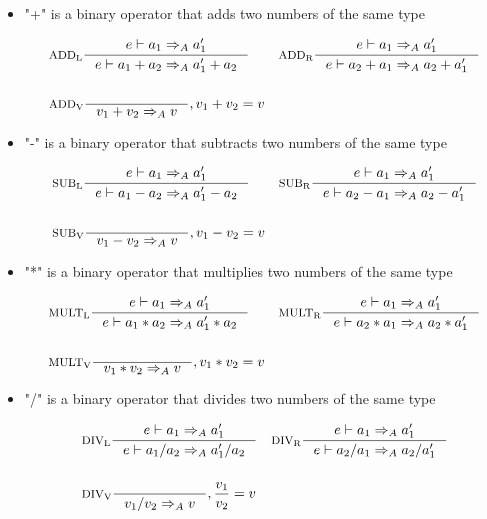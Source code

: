 \begin{itemize}
\item "+" is a binary operator that adds two numbers of the same type

\begin{align*}
&\inference[$\text{ADD}_\text{L}$]{e \vdash a_1 \Rightarrow_A a_1'}
                    {e \vdash  a_1 + a_2 \Rightarrow_A a_1' + a_2}
&
&\inference[$\text{ADD}_\text{R}$]{e \vdash a_1 \Rightarrow_A a_1'}
                    {e \vdash a_2 + a_1 \Rightarrow_A a_2 + a_1'}
\\\\
&\inference[$\text{ADD}_\text{V}$]{}
                    {v_1 + v_2 \Rightarrow_A v}
                    {, v_1 + v_2 = v}
\end{align*}

\item "-" is a binary operator that subtracts two numbers of the same type

\begin{align*}
&\inference[$\text{SUB}_\text{L}$]{e \vdash a_1 \Rightarrow_A a_1'}
                    {e \vdash a_1 - a_2 \Rightarrow_A a_1' - a_2}
&
&\inference[$\text{SUB}_\text{R}$]{e \vdash a_1 \Rightarrow_A a_1'}
                    {e \vdash a_2 - a_1 \Rightarrow_A a_2 - a_1'}
\\\\
&\inference[$\text{SUB}_\text{V}$]{}
                    {v_1 - v_2 \Rightarrow_A v}
                    {, v_1 - v_2 = v}
\end{align*}

\item "*" is a binary operator that multiplies two numbers of the same type

\begin{align*}
&\inference[$\text{MULT}_\text{L}$]{e \vdash a_1 \Rightarrow_A a_1'}
                     {e \vdash a_1 * a_2 \Rightarrow_A a_1' * a_2}
&
&\inference[$\text{MULT}_\text{R}$]{e \vdash a_1 \Rightarrow_A a_1'}
                     {e \vdash a_2 * a_1 \Rightarrow_A a_2 * a_1'}
\\\\
&\inference[$\text{MULT}_\text{V}$]{}
                     {v_1 * v_2 \Rightarrow_A v}
                     {, v_1 * v_2 = v}
\end{align*}

\item "/" is a binary operator that divides two numbers of the same type

\begin{align*}
&\inference[$\text{DIV}_\text{L}$]{e \vdash a_1 \Rightarrow_A a_1'}
                    {e \vdash a_1 / a_2 \Rightarrow_A a_1' / a_2}
&
&\inference[$\text{DIV}_\text{R}$]{e \vdash a_1 \Rightarrow_A a_1'}
                    {e \vdash a_2 / a_1 \Rightarrow_A a_2 / a_1'}
\\\\
&\inference[$\text{DIV}_\text{V}$]{}
                    {v_1 / v_2 \Rightarrow_A v}
                    {, \frac{v_1}{v_2} = v}
\end{align*}


\end{itemize}
